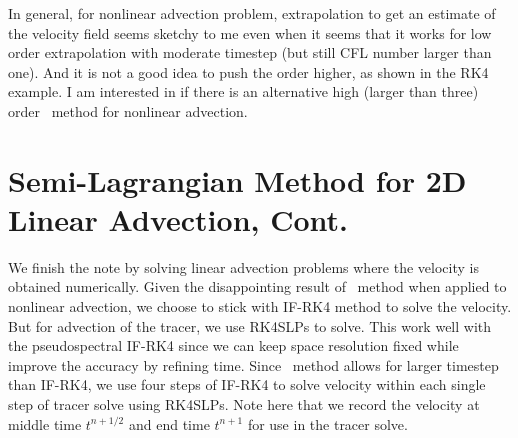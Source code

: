 \documentclass[11pt,letterpaper]{article}
\begin{document}
In general, for nonlinear advection problem, extrapolation to get an estimate of the velocity field seems sketchy to me even when it seems that it works for low order extrapolation with moderate timestep (but still CFL number larger than one). And it is not a good idea to push the order higher, as shown in the RK4 example. I am interested in if there is an alternative high (larger than three) order \sml\ method for nonlinear advection. 

\section{Semi-Lagrangian Method for 2D Linear Advection, Cont.}\label{sec:adv_NS}
We finish the note by solving linear advection problems where the velocity is obtained numerically. Given the disappointing result of \sml\ method when applied to nonlinear advection, we choose to stick with IF-RK4 method to solve the velocity. But for advection of the tracer, we use RK4SLPs to solve. This work well with the pseudospectral IF-RK4 since we can keep space resolution fixed while improve the accuracy by refining time. Since \sml\ method allows for larger timestep than IF-RK4, we use four steps of IF-RK4 to solve velocity within each single step of tracer solve using RK4SLPs. Note here that we record the velocity at middle time $t^{n+1/2}$ and end time $t^{n+1}$ for use in the tracer solve.
\end{document}
